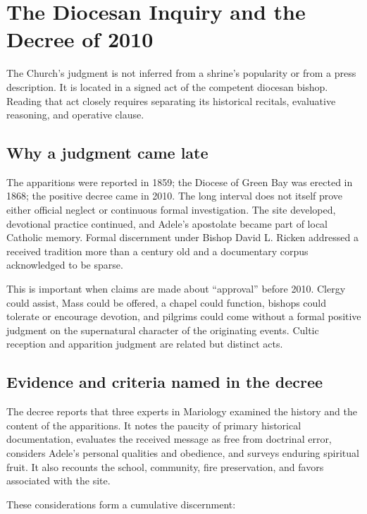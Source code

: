 \section{The Diocesan Inquiry and the Decree of 2010}

The Church's judgment is not inferred from a shrine's popularity or from a press description. It is located in a signed act of the competent diocesan bishop. Reading that act closely requires separating its historical recitals, evaluative reasoning, and operative clause.

\subsection{Why a judgment came late}

The apparitions were reported in 1859; the Diocese of Green Bay was erected in 1868; the positive decree came in 2010. The long interval does not itself prove either official neglect or continuous formal investigation. The site developed, devotional practice continued, and Adele's apostolate became part of local Catholic memory. Formal discernment under Bishop David L. Ricken addressed a received tradition more than a century old and a documentary corpus acknowledged to be sparse.

This is important when claims are made about “approval” before 2010. Clergy could assist, Mass could be offered, a chapel could function, bishops could tolerate or encourage devotion, and pilgrims could come without a formal positive judgment on the supernatural character of the originating events. Cultic reception and apparition judgment are related but distinct acts.

\subsection{Evidence and criteria named in the decree}

The decree reports that three experts in Mariology examined the history and the content of the apparitions. It notes the paucity of primary historical documentation, evaluates the received message as free from doctrinal error, considers Adele's personal qualities and obedience, and surveys enduring spiritual fruit. It also recounts the school, community, fire preservation, and favors associated with the site.

These considerations form a cumulative discernment:

